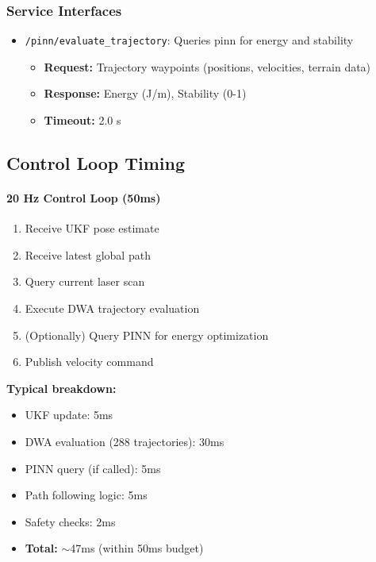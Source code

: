 \subsubsection{Service Interfaces}

\begin{itemize}
    \item \texttt{/pinn/evaluate\_trajectory}: Queries \acrshort{pinn} for energy and stability
    \begin{itemize}
        \item \textbf{Request:} Trajectory waypoints (positions, velocities, terrain data)
        \item \textbf{Response:} Energy (J/m), Stability (0-1)
        \item \textbf{Timeout:} 2.0 s
    \end{itemize}
\end{itemize}

\subsection{Control Loop Timing}

\paragraph{20 Hz Control Loop (50ms)}
\begin{enumerate}
    \item Receive UKF pose estimate
    \item Receive latest global path
    \item Query current laser scan
    \item Execute DWA trajectory evaluation
    \item (Optionally) Query PINN for energy optimization
    \item Publish velocity command
\end{enumerate}

\textbf{Typical breakdown:}
\begin{itemize}
    \item UKF update: 5ms
    \item DWA evaluation (288 trajectories): 30ms
    \item PINN query (if called): 5ms
    \item Path following logic: 5ms
    \item Safety checks: 2ms
    \item \textbf{Total:} $\sim$47ms (within 50ms budget)
\end{itemize}

